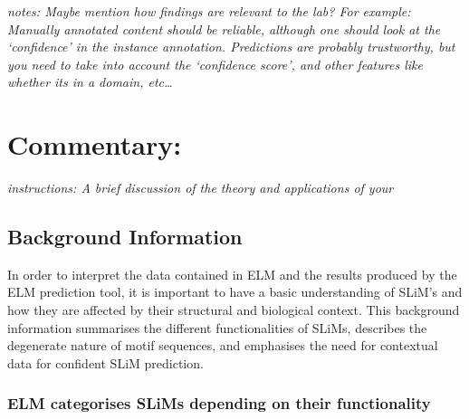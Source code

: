 \documentclass[12pt]{article}
\begin{document}
\emph{notes: Maybe mention how findings are relevant to the lab? For
example: Manually annotated content should be reliable, although one
should look at the `confidence' in the instance annotation. Predictions
are probably trustworthy, but you need to take into account the
`confidence score', and other features like whether its in a domain,
etc\ldots{}}

\section*{Commentary:}\label{commentary}

\emph{instructions: A brief discussion of the theory and applications of
your}

\subsection*{Background Information}\label{background-information}

In order to interpret the data contained in ELM and the results produced by the
ELM prediction tool, it is important to have a basic understanding of SLiM's
and how they are affected by their structural and biological context. This
background information summarises the different functionalities of SLiMs,
describes the degenerate nature of motif sequences, and emphasises the need for
contextual data for confident SLiM prediction.

\subsubsection*{ELM categorises SLiMs depending on their functionality}
\end{document}
